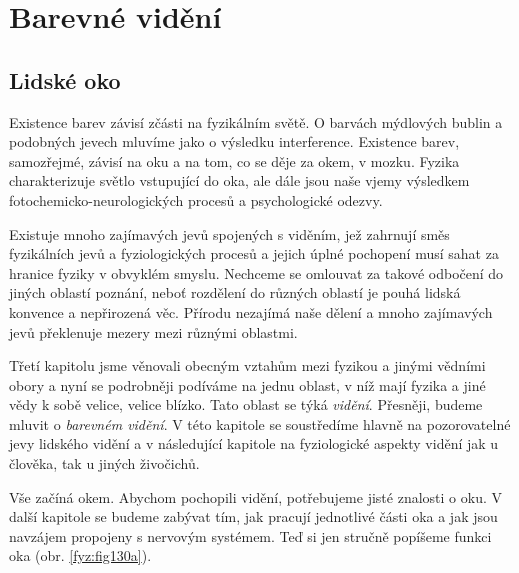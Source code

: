 \chapter{Barevné vidění}\label{fyz:IchapXXXV}
\minitoc
  \section{Lidské oko}\label{fyz:IchapXXXVsecI}
    Existence barev závisí zčásti na fyzikálním světě. O barvách mýdlových bublin a podobných 
    jevech mluvíme jako o výsledku interference. Existence barev, samozřejmé, závisí na oku a na 
    tom, co se děje za okem, v mozku. Fyzika charakterizuje světlo vstupující do oka, ale dále jsou 
    naše vjemy výsledkem fotochemicko-neurologických procesů a psychologické odezvy.
    
    Existuje mnoho zajímavých jevů spojených s viděním, jež zahrnují směs fyzikálních jevů a 
    fyziologických procesů a jejich úplné pochopení musí sahat za hranice fyziky v obvyklém smyslu. 
    Nechceme se omlouvat za takové odbočení do jiných oblastí poznání, neboť rozdělení do různých 
    oblastí je pouhá lidská konvence a nepřirozená věc. Přírodu nezajímá naše dělení a mnoho 
    zajímavých jevů překlenuje mezery mezi různými oblastmi.
   
    Třetí kapitolu jsme věnovali obecným vztahům mezi fyzikou a jinými vědními obory a nyní se 
    podrobněji podíváme na jednu oblast, v níž mají fyzika a jiné vědy k sobě velice, velice 
    blízko. Tato oblast se týká \emph{vidění}. Přesněji, budeme mluvit o \emph{barevném vidění}. V 
    této kapitole se soustředíme hlavně na pozorovatelné jevy lidského vidění a v následující 
    kapitole na fyziologické aspekty vidění jak u člověka, tak u jiných živočichů.
    
    Vše začíná okem. Abychom pochopili vidění, potřebujeme jisté znalosti o oku. V další kapitole 
    se budeme zabývat tím, jak pracují jednotlivé části oka a jak jsou navzájem propojeny s 
    nervovým systémem. Teď si jen stručně popíšeme funkci oka (obr. \ref{fyz:fig130a}).

